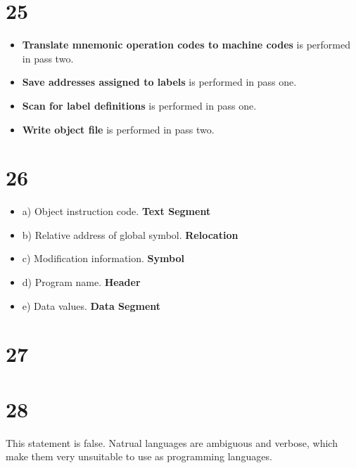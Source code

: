 \documentclass[a4paper,11pt]{article}
\begin{document}

\section*{25}
\begin{itemize}
  \item {\bf Translate mnemonic operation codes to machine codes} is performed in pass two.
  \item {\bf Save addresses assigned to labels} is performed in pass one. 
  \item {\bf Scan for label definitions} is performed in pass one.
  \item {\bf Write object file} is performed in pass two.
\end{itemize}



\section*{26}
\begin{itemize}
  \item a) Object instruction code. {\bf Text Segment}
  \item b) Relative address of global symbol.  {\bf Relocation}
  \item c) Modification information. {\bf Symbol}
  \item d) Program name.  {\bf Header}  
  \item e) Data values. {\bf Data Segment}
\end{itemize}



\section*{27}


\section*{28}
This statement is false.  Natrual languages are ambiguous and verbose, which make them very unsuitable to use as programming languages.

\end{document}
